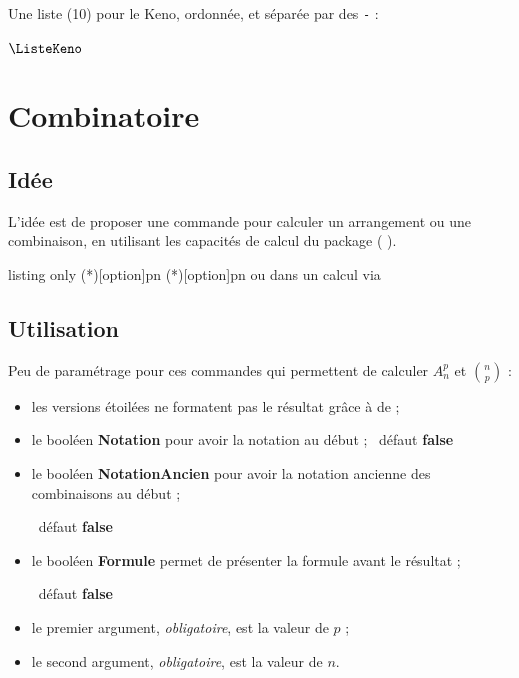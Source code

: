 \documentclass[a4paper,french,11pt]{article}
\newcommand\ctex[1]{\tcbox[vignettelatex]{#1}}
\newcommand\cmaj[1]{%
	{\tcbox[vignetteMaJ]{#1}\xspace}%
}
\newcommand\Cle[1]{{\bfseries\sffamily\textlangle \textcolor{orange!75!black}{#1}\textrangle}}
\begin{document}
\begin{PresCodePL}{}
Une liste (10) pour le Keno\textcopyright, ordonnée, et séparée par des \texttt{-} :

\TirageAleatoireEntiers[ValMin=1,ValMax=70,NbVal=10,Tri=croissant,Sep={-}]{\ListeKeno}
$\ListeKeno$

\setsepchar{-}\readlist*\KENO{\ListeKeno}\showitems{\KENO}
\end{PresCodePL}

\newpage

\section{Combinatoire}\label{combinatoire}

\subsection{Idée}

\begin{tipblock}
L'idée est de proposer une commande pour calculer un arrangement ou une combinaison, en utilisant les capacités de calcul du package \ctex{xint} (\cmaj{2.5.4}).
\end{tipblock}

\begin{PresCodeTexPL}{listing only}
\Arrangement(*)[option]{p}{n}
\Combinaison(*)[option]{p}{n}
 ou  dans un calcul via 
\end{PresCodeTexPL}

\subsection{Utilisation}

\begin{cautionblock}
Peu de paramétrage pour ces commandes qui permettent de calculer $A_n^p$ et $\binom{n}{p}$ :

\begin{itemize}
	\item les versions étoilées ne formatent pas le résultat grâce à \ctex{\textbackslash num} de \ctex{sinuitx} ;
	\item le booléen \Cle{Notation} pour avoir la notation au début ; \hfill~défaut \Cle{false}
	\item le booléen \Cle{NotationAncien} pour avoir la notation \og ancienne \fg{} des combinaisons au début ;
	
	\hfill~défaut \Cle{false}
	\item le booléen \Cle{Formule} permet de présenter la formule avant le résultat ;
	
	\hfill~défaut \Cle{false}
	\item le premier argument, \textit{obligatoire}, est la valeur de $p$ ;
	\item le second argument, \textit{obligatoire}, est la valeur de $n$.
\end{itemize}
\vspace*{-\baselineskip}\leavevmode
\end{cautionblock}
\end{document}
